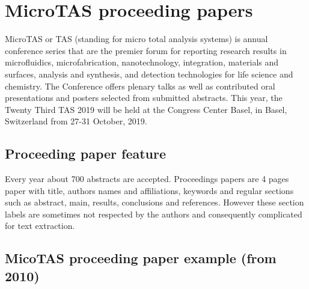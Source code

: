 \section{MicroTAS proceeding papers}

MicroTAS or \textmu TAS (standing for micro total analysis systems) is annual conference series that are the premier forum for reporting research results in microfluidics, microfabrication, nanotechnology, integration, materials and surfaces, analysis and synthesis, and detection technologies for life science and chemistry. The Conference offers plenary talks as well as contributed oral presentations and posters selected from submitted abstracts. This year, the Twenty Third \textmu TAS 2019 will be held at the Congress Center Basel, in Basel, Switzerland from 27-31 October, 2019.
\newline

\subsection{Proceeding paper feature}
Every year about 700 abstracts are accepted. Proceedings papers are 4 pages paper with title, authors names and affiliations, keywords and regular sections such as abstract, main, results, conclusions and references. However these section labels are sometimes not respected by the authors and consequently complicated for text extraction. 

\subsection{MicoTAS proceeding paper example (from 2010)}
